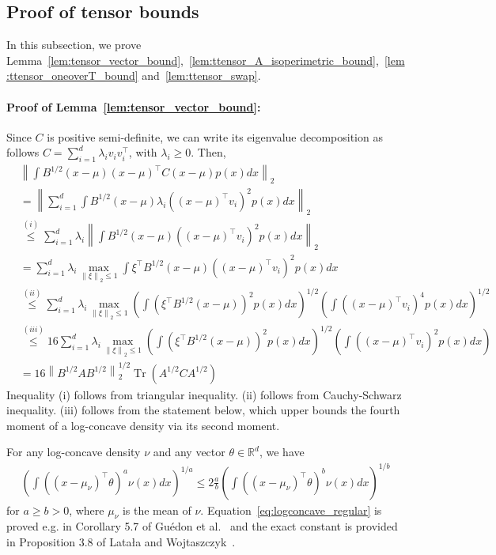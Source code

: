 \documentclass[11pt,twoside]{article}
\theoremstyle{named}
\theoremstyle{plain}
\newcommand{\vecnorm}[2]{\left\| #1\right\|_{#2}}
\newcommand{\usedim}{\ensuremath{d}}
\newcommand{\dims}{\usedim}
\DeclareMathOperator{\trace}{Tr}
\newcommand{\real}{\ensuremath{\mathbb{R}}}
\newcommand{\parenth}[1]{\left( #1 \right)}
\newcommand{\tp}{^\top}
\begin{document}
\subsection{Proof of tensor bounds} %
\label{sub:proof_of_tensor_bounds}
In this subsection, we prove Lemma~\ref{lem:tensor_vector_bound},~\ref{lem:ttensor_A_isoperimetric_bound},~\ref{lem:ttensor_oneoverT_bound} and~\ref{lem:ttensor_swap}.
\paragraph{Proof of Lemma~\ref{lem:tensor_vector_bound}:}
Since $C$ is positive semi-definite, we can write its eigenvalue decomposition as follows $C = \sum_{i=1}^\dims \lambda_i v_i v_i\tp$, with $\lambda_i \geq 0$.
Then,
\begin{align*}
  &\vecnorm{\int B^{1/2} (x-\mu) (x-\mu)\tp C (x-\mu) p(x) dx}{2} \\
  &= \vecnorm{\sum_{i=1}^\dims \int B^{1/2} (x-\mu) \lambda_i \parenth{(x-\mu)\tp v_i}^2 p(x) dx}{2}\\
  &\stackrel{(i)}{\leq} \sum_{i=1}^\dims \lambda_i \vecnorm{\int B^{1/2} (x-\mu) \parenth{(x-\mu)\tp v_i}^2 p(x) dx}{2}\\
  &= \sum_{i=1}^\dims \lambda_i \max_{\vecnorm{\xi}{2}\leq 1} \int \xi\tp B^{1/2} (x-\mu) \parenth{(x-\mu)\tp v_i}^2 p(x) dx \\
  &\stackrel{(ii)}{\leq} \sum_{i=1}^\dims \lambda_i \max_{\vecnorm{\xi}{2}\leq 1} \parenth{\int \parenth{\xi\tp B^{1/2} (x-\mu)}^2 p(x) dx}^{1/2} \parenth{\int \parenth{(x-\mu)\tp v_i}^4 p(x) dx}^{1/2} \\
  &\stackrel{(iii)}{\leq} 16 \sum_{i=1}^\dims \lambda_i \max_{\vecnorm{\xi}{2}\leq 1} \parenth{\int \parenth{\xi\tp B^{1/2} (x-\mu)}^2 p(x) dx}^{1/2} \parenth{\int \parenth{(x-\mu)\tp v_i}^2 p(x) dx} \\
  &= 16\vecnorm{B^{1/2} A B^{1/2} }{2}^{1/2} \trace\parenth{A^{1/2}CA^{1/2}}
\end{align*}
Inequality (i) follows from triangular inequality. (ii) follows from Cauchy-Schwarz inequality. (iii) follows from the statement below, which upper bounds the fourth moment of a log-concave density via its second moment.

For any log-concave density $\nu$ and any vector $\theta\in \real^{\dims}$, we have
\begin{align}
  \label{eq:logconcave_regular}
  \parenth{\int \parenth{(x-\mu_\nu)\tp\theta}^a \nu(x) dx}^{1/a} \leq 2 \frac{a}{b} \parenth{\int \parenth{(x-\mu_\nu)\tp\theta}^b \nu(x) dx}^{1/b}
\end{align}
for $a \geq b > 0$, where $\mu_\nu$ is the mean of $\nu$. Equation~\eqref{eq:logconcave_regular} is proved e.g. in Corollary 5.7 of Gu\'edon et al.~\cite{guedon2014concentration} and the exact constant is provided in Proposition 3.8 of Lata{\l}a and Wojtaszczyk~\cite{latala2008infimum}.
\end{document}
